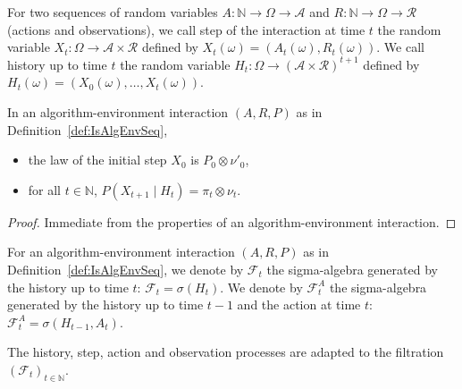 \begin{definition}[History]\label{def:history}
  \leanok
For two sequences of random variables $A : \mathbb{N} \to \Omega \to \mathcal{A}$ and $R : \mathbb{N} \to \Omega \to \mathcal{R}$ (actions and observations), we call step of the interaction at time $t$ the random variable $X_t : \Omega \to \mathcal{A} \times \mathcal{R}$ defined by $X_t(\omega) = (A_t(\omega), R_t(\omega))$.
We call history up to time $t$ the random variable $H_t : \Omega \to (\mathcal{A} \times \mathcal{R})^{t+1}$ defined by $H_t(\omega) = (X_0(\omega), \ldots, X_t(\omega))$.
\end{definition}


\begin{lemma}\label{lem:law_step}
  \leanok
In an algorithm-environment interaction $(A, R, P)$ as in Definition~\ref{def:IsAlgEnvSeq},
\begin{itemize}
  \item the law of the initial step $X_0$ is $P_0 \otimes \nu'_0$,
  \item for all $t \in \mathbb{N}$, $P \left( X_{t+1} \mid H_t \right) = \pi_t \otimes \nu_t$.
\end{itemize}
\end{lemma}

\begin{proof}\leanok
Immediate from the properties of an algorithm-environment interaction.
\end{proof}


\begin{definition}\label{def:IsAlgEnvSeq.filtration}
  \leanok
For an algorithm-environment interaction $(A, R, P)$ as in Definition~\ref{def:IsAlgEnvSeq}, we denote by $\mathcal{F}_t$ the sigma-algebra generated by the history up to time $t$: $\mathcal{F}_t = \sigma(H_t)$.
We denote by $\mathcal{F}^A_t$ the sigma-algebra generated by the history up to time $t-1$ and the action at time $t$: $\mathcal{F}^A_t = \sigma(H_{t-1}, A_t)$.
\end{definition}


\begin{lemma}\label{lem:IsAlgEnvSeq.adapted}
  \leanok
The history, step, action and observation processes are adapted to the filtration $(\mathcal{F}_t)_{t \in \mathbb{N}}$.
\end{lemma}

